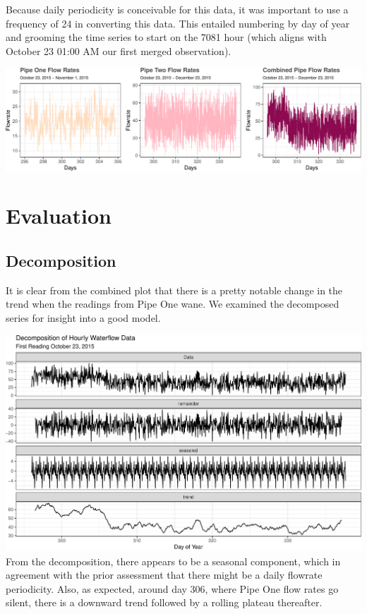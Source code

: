 \documentclass[openany]{book}
\begin{document}
Because daily periodicity is conceivable for this data, it was important
to use a frequency of 24 in converting this data. This entailed
numbering by day of year and grooming the time series to start on the
7081 hour (which aligns with October 23 01:00 AM our first merged
observation).

\includegraphics{Group2_Project1_Fall2019_files/figure-latex/unnamed-chunk-14-1.pdf}

\hypertarget{evaluation-2}{%
\section{Evaluation}\label{evaluation-2}}

\hypertarget{decomposition}{%
\subsection{Decomposition}\label{decomposition}}

It is clear from the combined plot that there is a pretty notable change
in the trend when the readings from Pipe One wane. We examined the
decomposed series for insight into a good model.

\includegraphics{Group2_Project1_Fall2019_files/figure-latex/unnamed-chunk-15-1.pdf}
From the decomposition, there appears to be a seasonal component, which
in agreement with the prior assessment that there might be a daily
flowrate periodicity. Also, as expected, around day 306, where Pipe One
flow rates go silent, there is a downward trend followed by a rolling
plateau thereafter.
\end{document}
